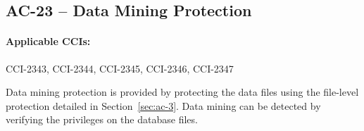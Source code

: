 \documentclass[letterpaper, 10pt, twoside]{article}
\begin{document}
\subsection{AC-23 -- Data Mining Protection}

\paragraph{Applicable CCIs:} CCI-2343, CCI-2344, CCI-2345, CCI-2346, CCI-2347

Data mining protection is provided by protecting the data files using the file-level protection detailed in Section~\ref{sec:ac-3}. Data mining can be detected by verifying the privileges on the database files.

\clearpage
\printbibliography
\end{document}
